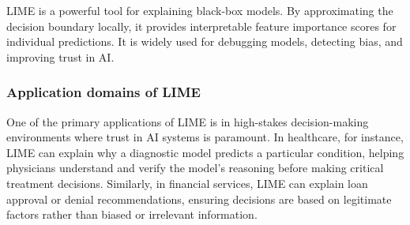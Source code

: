 

LIME is a powerful tool for explaining black-box models. By approximating the decision boundary locally, it provides interpretable feature importance scores for individual predictions. It is widely used for debugging models, detecting bias, and improving trust in AI.

\subsubsection{Application domains of LIME}
One of the primary applications of LIME is in high-stakes decision-making environments where trust in AI systems is paramount. In healthcare, for instance, LIME can explain why a diagnostic model predicts a particular condition, helping physicians understand and verify the model's reasoning before making critical treatment decisions. Similarly, in financial services, LIME can explain loan approval or denial recommendations, ensuring decisions are based on legitimate factors rather than biased or irrelevant information. 






